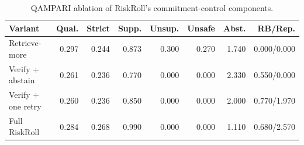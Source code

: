\begin{table}[t]
\centering
\scriptsize
\setlength{\tabcolsep}{2.0pt}
\begin{tabular}{lrrrrrrr}
\toprule
Variant & Qual. & Strict & Supp. & Unsup. & Unsafe & Abst. & RB/Rep. \\
\midrule
Retrieve-more & 0.297 & 0.244 & 0.873 & 0.300 & 0.270 & 1.740 & 0.000/0.000 \\
Verify + abstain & 0.261 & 0.236 & 0.770 & 0.000 & 0.000 & 2.330 & 0.550/0.000 \\
Verify + one retry & 0.260 & 0.236 & 0.850 & 0.000 & 0.000 & 2.000 & 0.770/1.970 \\
Full RiskRoll & 0.284 & 0.268 & 0.990 & 0.000 & 0.000 & 1.110 & 0.680/2.570 \\
\bottomrule
\end{tabular}
\caption{QAMPARI ablation of RiskRoll's commitment-control components.}
\label{tab:riskroll_ablation}
\end{table}
